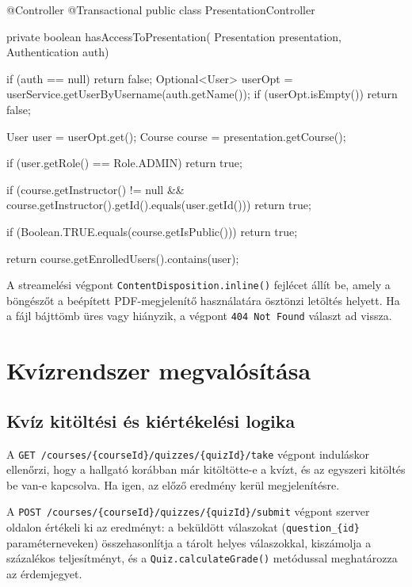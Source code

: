 \begin{java}[caption={PDF tartalom streamelése és hozzáférés-ellenőrzés},label=java:presentaccess]
@Controller
@Transactional
public class PresentationController {

    private boolean hasAccessToPresentation(
            Presentation presentation, Authentication auth) {
        if (auth == null) return false;
        Optional<User> userOpt =
                userService.getUserByUsername(auth.getName());
        if (userOpt.isEmpty()) return false;

        User   user   = userOpt.get();
        Course course = presentation.getCourse();

        if (user.getRole() == Role.ADMIN) return true;

        if (course.getInstructor() != null
                && course.getInstructor().getId().equals(user.getId()))
            return true;

        if (Boolean.TRUE.equals(course.getIsPublic())) return true;

        return course.getEnrolledUsers().contains(user);
    }
}
\end{java}

A streamelési végpont \texttt{ContentDisposition.inline()} fejlécet állít be, amely a böngészőt a beépített PDF-megjelenítő használatára ösztönzi letöltés helyett. Ha a fájl bájttömb üres vagy hiányzik, a végpont \texttt{404 Not Found} választ ad vissza.

\section{Kvízrendszer megvalósítása}

\subsection{Kvíz kitöltési és kiértékelési logika}

A \texttt{GET /courses/\{courseId\}/quizzes/\{quizId\}/take} végpont induláskor ellenőrzi, hogy a hallgató korábban már kitöltötte-e a kvízt, és az egyszeri kitöltés be van-e kapcsolva. Ha igen, az előző eredmény kerül megjelenítésre.

A \texttt{POST /courses/\{courseId\}/quizzes/\{quizId\}/submit} végpont szerver oldalon értékeli ki az eredményt: a beküldött válaszokat (\texttt{question\_\{id\}} paraméterneveken) összehasonlítja a tárolt helyes válaszokkal, kiszámolja a százalékos teljesítményt, és a \texttt{Quiz.calculateGrade()} metódussal meghatározza az érdemjegyet.


